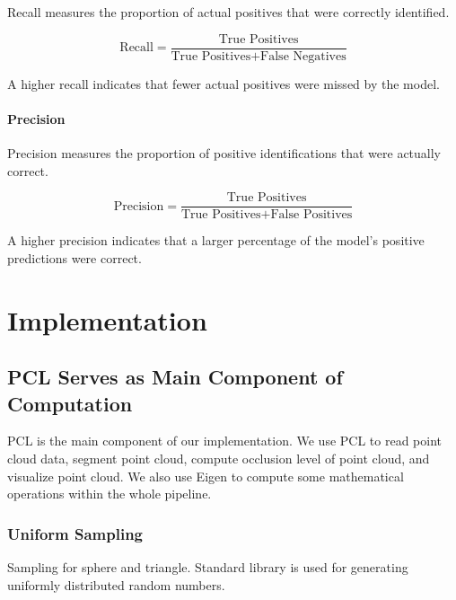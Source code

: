 \documentclass[11pt, a4paper,oneside,chapterprefix=false]{scrbook}
\begin{document}
Recall measures the proportion of actual positives that were correctly identified.

\begin{equation}
	\text{Recall} = \frac{\text{True Positives}}{\text{True Positives} + \text{False Negatives}}
\end{equation}

A higher recall indicates that fewer actual positives were missed by the model.

\subsubsection{Precision}

Precision measures the proportion of positive identifications that were actually correct.

\begin{equation}
	\text{Precision} = \frac{\text{True Positives}}{\text{True Positives} + \text{False Positives}}
\end{equation}

A higher precision indicates that a larger percentage of the model's positive predictions were correct.

\chapter{Implementation} \label{chp:implementation}


\section{PCL Serves as Main Component of Computation} \label{sec:pcl and eigen}

PCL is the main component of our implementation. We use PCL to read point cloud data, segment point cloud, compute occlusion level of point cloud, and visualize point cloud. We also use Eigen to compute some mathematical operations within the whole pipeline.

\subsection{Uniform Sampling} \label{subsec:uniform sampling}

Sampling for sphere and triangle. Standard library is used for generating uniformly distributed random numbers.
\end{document}
